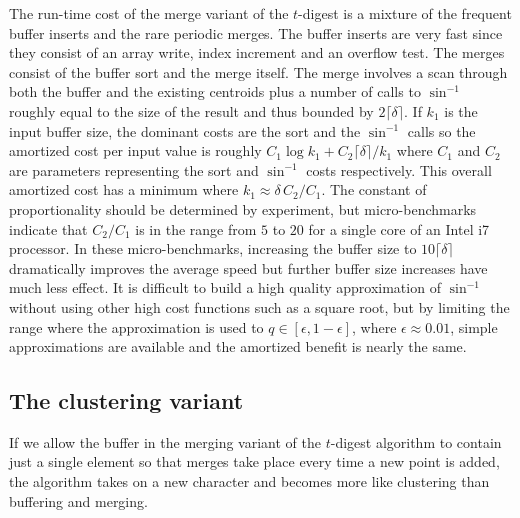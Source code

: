 \documentclass[11pt]{amsart}
\begin{document}
The run-time cost of the merge variant of the $t$-digest is a mixture of the frequent buffer inserts  and the rare periodic merges. The buffer inserts are very fast since they consist of an array write, index increment and an overflow test. The merges consist of the buffer sort and the merge itself. The merge involves a scan through both the buffer and the existing centroids plus a number of calls to $\sin^{-1}$ roughly equal to the size of the result and thus bounded by $2 \lceil \delta \rceil$. If $k_1$ is the input buffer size, the dominant costs are the sort and the $\sin^{-1}$ calls so the amortized cost per input value is roughly $C_1 \log k_1 + C_2 \lceil \delta \rceil / k_1$ where $C_1$ and $C_2$ are parameters representing the sort and $\sin^{-1}$ costs respectively. This overall amortized cost has a minimum where $k_1 \approx \delta\, C_2  / C_1$. The constant of proportionality should be determined by experiment, but micro-benchmarks indicate that $C_2 / C_1$ is in the range from $5$ to $20$ for a single core of an Intel i7 processor. In these micro-benchmarks, increasing the buffer size to $10 \lceil \delta \rceil$ dramatically improves the average speed but further buffer size increases have much less effect. It is difficult to build a high quality approximation of $\sin^{-1}$ without using other high cost functions such as a square root, but by limiting the range where the approximation is used to $q \in [\epsilon, 1-\epsilon]$, where $\epsilon \approx 0.01$, simple approximations are available and the amortized benefit is nearly the same.

\subsection{The clustering variant}
If we allow the buffer in the merging variant of the $t$-digest algorithm to contain just a single element so that merges take place every time a new point is added, the algorithm takes on a new character and becomes more like clustering than buffering and merging.
\end{document}
